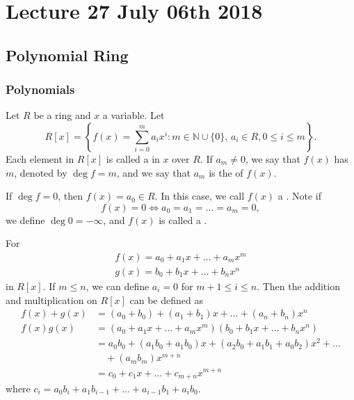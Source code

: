 \chapter{Lecture 27 July 06th 2018}%
\label{chp:lecture_27_july_06th_2018}

\section{Polynomial Ring}%
\label{sec:polynomial_ring}

\subsection{Polynomials}%
\label{sub:polynomials}

\begin{defn}[Polynomials]
\label{defn:polynomials}
  Let $R$ be a ring and $x$ a variable. Let
  \begin{equation*}
    R[x] = \left\{ f(x) = \sum_{i=0}^{m} a_i x^i : m \in \mathbb{N} \cup \{0\}, \, a_i \in R, 0 \leq i \leq m \right\}.
  \end{equation*}
  Each element in $R[x]$ is called a  in $x$ over $R$. If $a_m \neq 0$, we say that $f(x)$ has  $m$, denoted by $\deg f = m$, and we say that $a_m$ is the  of $f(x)$.

  If $\deg f = 0$, then $f(x) = a_0 \in R$. In this case, we call $f(x)$ a . Note if
  \begin{equation*}
    f(x) = 0 \iff a_0 = a_1 = ... = a_m = 0,
  \end{equation*}
  we define $\deg 0 = - \infty$, and $f(x)$ is called a .
\end{defn}

For
\begin{gather*}
  f(x) = a_0 + a_1 x + \hdots + a_m x^m \\
  g(x) = b_0 + b_1 x + \hdots + b_n x^n
\end{gather*}
in $R[x]$. If $m \leq n$, we can define $a_i = 0$ for $m + 1 \leq i \leq n$. Then the addition and multiplication on $R[x]$ can be defined as
\begin{align*}
  f(x) + g(x) &= (a_0 + b_0) + (a_1 + b_1) x + \hdots + (a_n + b_n) x^n \\
  f(x) g(x) &= (a_0 + a_1 x + \hdots + a_m x^m) (b_0 + b_1 x + \hdots + b_n x^n) \\
            &= a_0 b_0 + (a_1 b_0 + a_1 b_0) x + (a_2 b_0 + a_1 b_1 + a_0 b_2) x^2 + \hdots \\
            &\quad + (a_m b_m) x^{m + n} \\
            &= c_0 + c_1 x + \hdots + c_{m + n} x^{m + n}
\end{align*}
where $c_i = a_0 b_i + a_1 b_{i - 1} + \hdots + a_{i - 1} b_1 + a_i b_0$.

